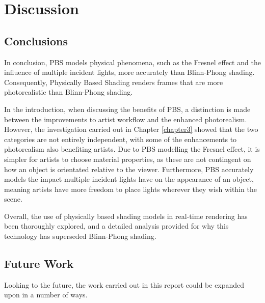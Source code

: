 \chapter{Discussion}
\label{chapter4}

\section{Conclusions}

In conclusion, PBS models physical phenomena, such as the Fresnel effect and the influence of multiple incident lights, more accurately than Blinn-Phong shading. Consequently, Physically Based Shading renders frames that are more photorealistic than Blinn-Phong shading.

In the introduction, when discussing the benefits of PBS, a distinction is made between the improvements to artist workflow and the enhanced photorealism. However, the investigation carried out in Chapter \ref{chapter3} showed that the two categories are not entirely independent, with some of the enhancements to photorealism also benefiting artists. Due to PBS modelling the Fresnel effect, it is simpler for artists to choose material properties, as these are not contingent on how an object is orientated relative to the viewer. Furthermore, PBS accurately models the impact multiple incident lights have on the appearance of an object, meaning artists have more freedom to place lights wherever they wish within the scene.

Overall, the use of physically based shading models in real-time rendering has been thoroughly explored, and a detailed analysis provided for why this technology has superseded Blinn-Phong shading.

\section{Future Work}

Looking to the future, the work carried out in this report could be expanded upon in a number of ways.

